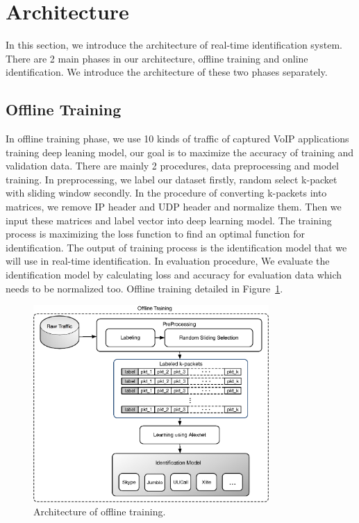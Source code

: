 \documentclass[conference]{IEEEtran}
\begin{document}
\section{Architecture}
\label{sec:architecture}
In this section, we introduce the architecture of real-time identification system. There are 2 main phases in our architecture, offline training and online identification. We introduce the architecture of these two phases separately.

\subsection{Offline Training}
In offline training phase, we use 10 kinds of traffic of captured VoIP applications training deep leaning model, our goal is to maximize the accuracy of training and validation data. There are mainly 2 procedures, data preprocessing and model training. In preprocessing, we label our dataset firstly, random select k-packet with sliding window secondly. In the procedure of converting k-packets into matrices, we remove IP header and UDP header and normalize them. Then we input these matrices and label vector into deep learning model. The training process is maximizing the loss function to find an optimal function for identification. The output of training process is the identification model that we will use in real-time identification. In evaluation procedure, We evaluate the identification model by calculating loss and accuracy for evaluation data which needs to be normalized too. Offline training detailed in Figure~\ref{fig:offline_architecture.eps}.

\begin{figure}[htp]
\begin{center}
\includegraphics[width=0.8\textwidth]{offline_architecture.eps}
\caption{Architecture of offline training.}\label{fig:offline_architecture.eps}
\end{center}
\end{figure}
\end{document}
